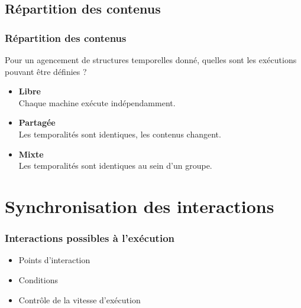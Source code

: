 \documentclass[handout]{beamer}
\begin{document}
\subsection{Répartition des contenus}
\begin{frame}
\frametitle{Répartition des contenus}
{\Large Pour un agencement de structures temporelles donné, quelles sont les exécutions pouvant être définies ?}
\large
\begin{itemize}
    \item<1> \textbf{Libre}~\\Chaque machine exécute indépendamment.
    \item<2> \textbf{Partagée}~\\Les temporalités sont identiques, les contenus changent.
    \item<3> \textbf{Mixte}~\\Les temporalités sont identiques au sein d'un groupe.
\end{itemize}
\end{frame}

\section{Synchronisation des interactions}
\begin{frame}
\frametitle{Interactions possibles à l'exécution}
\Large
\begin{itemize}
	\item<1> Points d'interaction
	\item<2> Conditions
	\item<3> Contrôle de la vitesse d'exécution 
\end{itemize}
\end{frame}
\end{document}

